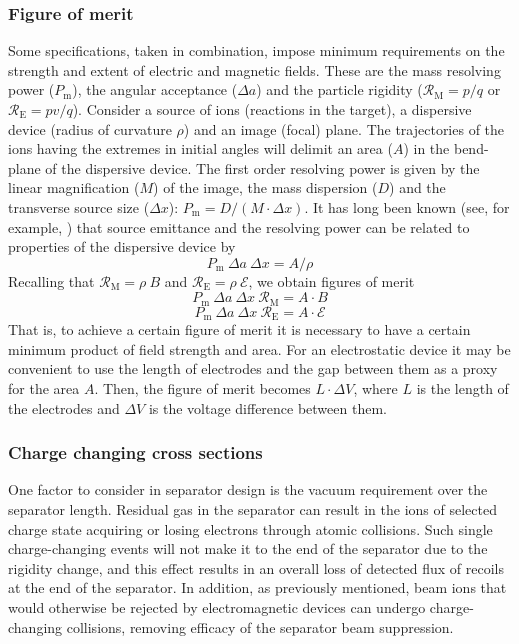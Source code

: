   \subsubsection{Figure of merit}
  Some specifications, taken in combination, impose minimum requirements on the strength and extent of electric and magnetic fields.   These are the mass resolving power ($P_\mathrm{m}$), the angular acceptance ($\Delta a$) and the particle rigidity 
  ($\mathcal{R}_\mathrm{M}=p/q$ or $\mathcal{R}_\mathrm{E}=pv/q$).    
  Consider a source of ions (reactions in the target), a dispersive device  (radius of curvature $\rho$) and an image (focal) plane.   The  trajectories of the ions having the extremes in initial angles will delimit an area ($A$)  in the bend-plane of the dispersive device.     The first order resolving power is given by the linear magnification ($M$) of the image, the mass dispersion ($D$) and the transverse source size ($\Delta x$): 
  $P_\mathrm{m} = D/(M \cdot \Delta x) $. 
  It has long been known (see, for example, \cite{Wo71}) that source emittance and the resolving power can be related to properties of the dispersive device by
  \[ P_\mathrm{m}\  \Delta a\  \Delta x = A/\rho \]
  Recalling that 
  $\mathcal{R}_\mathrm{M}=\rho \ B$ and $\mathcal{R}_\mathrm{E}=\rho \ \mathcal{E}$,  we obtain  figures of merit 
  \[ P_\mathrm{m}\  \Delta a\  \Delta x \ \mathcal{R}_\mathrm{M} = A \cdot B \]
   \[P_\mathrm{m}\  \Delta a\  \Delta x \ \mathcal{R}_\mathrm{E} = A \cdot \mathcal{E} \]
   That is, to achieve a certain figure of merit it is necessary to have a certain minimum product of field strength and area.  For an electrostatic device it may be convenient to use the length of electrodes and the gap between them as a proxy for the area $A$.  Then, the figure of merit becomes $L\cdot\Delta V$, where $L$ is the length of the electrodes and $\Delta V$ is the voltage difference between them.
   
\subsubsection{Charge changing cross sections}
One factor to consider in separator design is the vacuum requirement over the separator length. Residual gas in the separator can result in the ions of selected charge state acquiring or losing electrons through atomic collisions. Such single charge-changing events will not make it to the end of the separator due to the rigidity change, and this effect results in an overall loss of detected flux of recoils at the end of the separator.  In addition, as previously mentioned, beam ions that would otherwise be rejected by electromagnetic devices can undergo charge-changing collisions, removing efficacy of the separator beam suppression.

